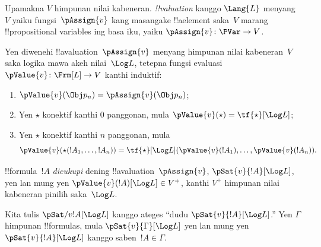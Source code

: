 \documentclass[../../../include/open-logic-section]{subfiles}
\begin{document}


\begin{defn}[!!^{valuation}s] 
Upamakna $V$ himpunan nilai kabeneran. \emph{!!{valuation}} kanggo
$\Lang{L}$ menyang~$V$ yaiku
fungsi~$\pAssign{v}$ kang masangake !!a{element} saka~$V$
marang !!{propositional variable}s ing basa iku, yaiku
$\pAssign{v} \colon \PVar \to V$.
\end{defn}

\begin{defn}
  Yen diwenehi !!a{valuation}~$\pAssign{v}$ menyang himpunan nilai
  kabeneran~$V$ saka logika mawa akeh nilai~$\Log L$, tetepna
  fungsi evaluasi $\pValue{v} \colon \Frm[L] \to V$ kanthi induktif:
  \begin{enumerate}
    \item $\pValue{v}(\Obj p_n) = \pAssign{v}(\Obj p_n)$;
    \item Yen $\star$ konektif kanthi $0$ panggonan, mula
    $\pValue{v}(\star)  = \tf{\star}[\Log L]$;
    \item Yen $\star$ konektif kanthi $n$ panggonan, mula
    \[
      \pValue{v}(\star(!A_1, \dots, !A_n)) = \tf{\star}[\Log L]
      (\pValue{v}(!A_1), \dots, \pValue{v}(!A_n)).
    \]
  \end{enumerate}
\end{defn}

\begin{defn}[Panyukupan]
 !!{formula}~$!A$ \emph{dicukupi}
  dening !!a{valuation}~$\pAssign{v}$, $\pSat{v}{!A}[\Log L]$,
  yen lan mung yen $\pValue{v}(!A)[\Log L] \in V^+$,
  kanthi $V^+$ himpunan nilai kabeneran pinilih saka~$\Log L$.
  
  Kita tulis $\pSat/{v}{!A}[\Log L]$ kanggo ateges
  ``dudu $\pSat{v}{!A}[\Log L]$.'' Yen $\Gamma$ himpunan
  !!{formula}s, mula $\pSat{v}{\Gamma}[\Log L]$ yen lan mung yen
  $\pSat{v}{!A}[\Log L]$ kanggo saben~$!A \in \Gamma$.
\end{defn}
\end{document}
